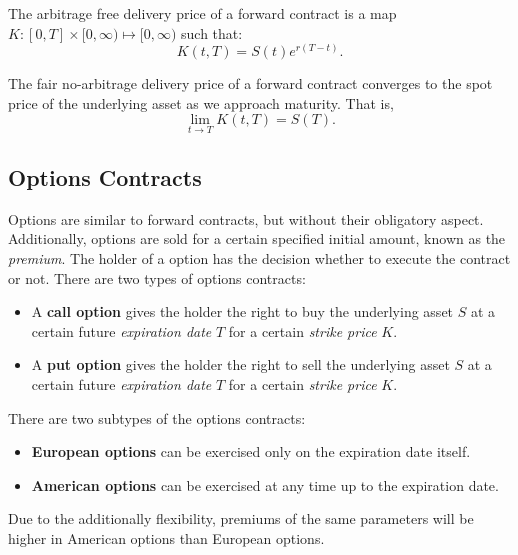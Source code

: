 \raggedright%
\begin{prop}
  The arbitrage free delivery price of a forward contract is a map $K: \left[
  0,T \right]\times [0,\infty)\mapsto [0, \infty)$ such that:
  \[K(t,T)=S(t)e^{r(T-t)}.\] 
\end{prop}
\begin{prop}
  The fair no-arbitrage delivery price of a forward contract converges to the spot price
  of the underlying asset as we approach maturity. That is,
  \[\lim_{t \to T} K(t,T)=S(T).\]
\end{prop}

\subsection{Options Contracts}
Options are similar to forward contracts, but without their obligatory aspect.
Additionally, options are sold for a certain specified initial amount, known as
the \textit{premium}.  The holder of a option has the decision whether to
execute the contract or not.  There are two types of options contracts:
\begin{itemize}
  \item A \textbf{call option} gives the holder the right to buy the underlying
    asset $S$ at a certain future \textit{expiration date} $T$ for a certain
    \textit{strike price} $K$.
  \item A \textbf{put option} gives the holder the right to sell the underlying
    asset $S$ at a certain future \textit{expiration date} $T$ for a certain
    \textit{strike price} $K$.
\end{itemize}
\begin{remark}
  There are two subtypes of the options contracts:
  \begin{itemize}
    \item \textbf{European options} can be exercised only on the expiration date itself.
    \item \textbf{American options} can be exercised at any time up to the expiration date.
  \end{itemize}
  Due to the additionally flexibility, premiums of the same parameters will be
  higher in American options than European options.
\end{remark}
